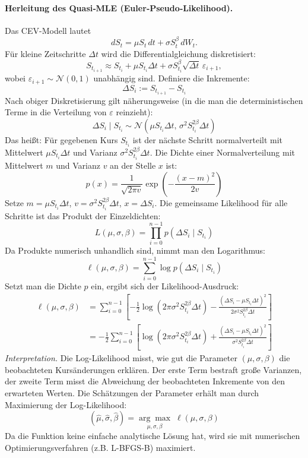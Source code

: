 \paragraph{Herleitung des Quasi‑MLE (Euler‑Pseudo‑Likelihood).}
Das CEV-Modell lautet
$$
dS_t = \mu S_t\,dt + \sigma S_t^{\beta}\,dW_t.
$$
Für kleine Zeitschritte $\Delta t$ wird die Differentialgleichung diskretisiert:
$$
S_{t_{i+1}} \approx S_{t_i} + \mu S_{t_i} \Delta t + \sigma S_{t_i}^{\beta} \sqrt{\Delta t}\, \varepsilon_{i+1},
$$
wobei $\varepsilon_{i+1} \sim \mathcal N(0,1)$ unabhängig sind.
Definiere die Inkremente:
$$
\Delta S_i := S_{t_{i+1}} - S_{t_i}
$$
Nach obiger Diskretisierung gilt näherungsweise (in die man die deterministischen Terme in die Verteilung von $\varepsilon$ reinzieht):
$$
\Delta S_i \mid S_{t_i} \sim \mathcal N\left(\mu S_{t_i} \Delta t,\, \sigma^2 S_{t_i}^{2\beta} \Delta t\right)
$$
Das heißt: Für gegebenen Kurs $S_{t_i}$ ist der nächste Schritt normalverteilt mit Mittelwert $\mu S_{t_i} \Delta t$ und Varianz $\sigma^2 S_{t_i}^{2\beta} \Delta t$.
Die Dichte einer Normalverteilung mit Mittelwert $m$ und Varianz $v$ an der Stelle $x$ ist:
$$
p(x) = \frac{1}{\sqrt{2\pi v}} \exp\left(-\frac{(x-m)^2}{2v}\right)
$$
Setze $m = \mu S_{t_i} \Delta t$, $v = \sigma^2 S_{t_i}^{2\beta} \Delta t$, $x = \Delta S_i$.
Die gemeinsame Likelihood für alle Schritte ist das Produkt der Einzeldichten:
$$
L(\mu, \sigma, \beta) = \prod_{i=0}^{n-1} p(\Delta S_i \mid S_{t_i})
$$
Da Produkte numerisch unhandlich sind, nimmt man den Logarithmus:
$$
\ell(\mu, \sigma, \beta) = \sum_{i=0}^{n-1} \log p(\Delta S_i \mid S_{t_i})
$$
Setzt man die Dichte $p$ ein, ergibt sich der Likelihood-Ausdruck:
\begin{align*}
\ell(\mu, \sigma, \beta) &= \sum_{i=0}^{n-1} \left[
    -\frac{1}{2} \log(2\pi \sigma^2 S_{t_i}^{2\beta} \Delta t)
    -\frac{(\Delta S_i - \mu S_{t_i} \Delta t)^2}{2 \sigma^2 S_{t_i}^{2\beta} \Delta t}
\right] \\
&= -\frac{1}{2} \sum_{i=0}^{n-1} \left[
    \log(2\pi \sigma^2 S_{t_i}^{2\beta} \Delta t)
    + \frac{(\Delta S_i - \mu S_{t_i} \Delta t)^2}{\sigma^2 S_{t_i}^{2\beta} \Delta t}
\right]
\end{align*}
\textit{Interpretation.} Die Log-Likelihood misst, wie gut die Parameter $(\mu, \sigma, \beta)$ die beobachteten Kursänderungen erklären. Der erste Term bestraft große Varianzen, der zweite Term misst die Abweichung der beobachteten Inkremente von den erwarteten Werten.
Die Schätzungen der Parameter erhält man durch Maximierung der Log-Likelihood:
$$
(\widehat{\mu}, \widehat{\sigma}, \widehat{\beta}) = \underset{\mu, \sigma, \beta}{\arg\max} \; \ell(\mu, \sigma, \beta)
$$
Da die Funktion keine einfache analytische Lösung hat, wird sie mit numerischen Optimierungsverfahren (z.B. L-BFGS-B) maximiert.

